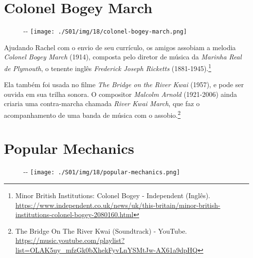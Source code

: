 \hypertarget{colonel-bogey-march}{%
\section{Colonel Bogey March}\label{colonel-bogey-march}}

\begin{figure}[!ht]
  \begin{adjustwidth}{-\oddsidemargin-1in}{-\rightmargin}
    \centering
    \texttt{[image: ./S01/img/18/colonel-bogey-march.png]}
  \end{adjustwidth}
\end{figure}

Ajudando Rachel com o envio de seu currículo, os amigos assobiam a
melodia \emph{Colonel Bogey March} (1914), composta pelo diretor de
música da \emph{Marinha Real de Plymouth}, o tenente inglês
\emph{Frederick Joseph Ricketts} (1881-1945).\footnote{\sloppy Minor British Institutions: Colonel Bogey - Independent (Inglês). \url{https://www.independent.co.uk/news/uk/this-britain/minor-british-institutions-colonel-bogey-2080160.html}}

Ela também foi usada no filme \emph{The Bridge on the River Kwai}
(1957), e pode ser ouvida em sua trilha sonora. O compositor
\emph{Malcolm Arnold} (1921-2006) ainda criaria uma contra-marcha
chamada \emph{River Kwai March}, que faz o acompanhamento de uma banda
de música com o assobio.\footnote{\sloppy The Bridge On The River Kwai (Soundtrack) - YouTube. \url{https://music.youtube.com/playlist?list=OLAK5uy_mfzGk0bXhekFyvLnYSMtJw-AX61a9dpHQ}}

\hypertarget{popular-mechanics}{%
\section{Popular Mechanics}\label{popular-mechanics}}

\begin{figure}[!ht]
  \begin{adjustwidth}{-\oddsidemargin-1in}{-\rightmargin}
    \centering
    \texttt{[image: ./S01/img/18/popular-mechanics.png]}
  \end{adjustwidth}
\end{figure}

